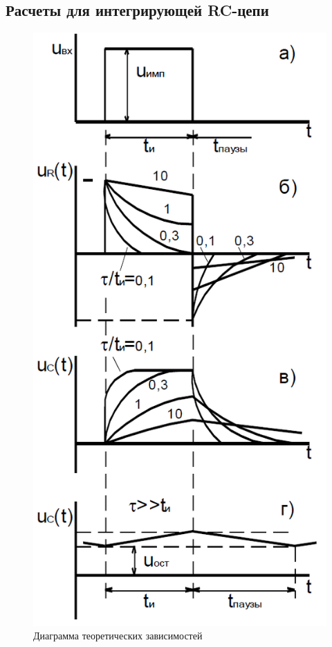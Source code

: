 \subsection{Расчеты для интегрирующей RC-цепи}

\begin{figure}[h]
\centering
\includegraphics[scale=0.35]{theory.png}
\caption{Диаграмма теоретических зависимостей}\label{figure:5:n:b}
\end{figure}

